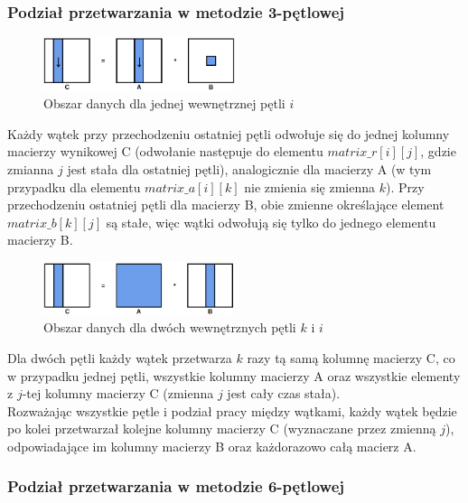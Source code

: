 \documentclass[10pt,a4paper]{article}
\begin{document}
\newpage

\subsubsection{Podział przetwarzania w metodzie 3-pętlowej}
\begin{figure}[h]
	\centering
	\includegraphics[width=0.5\textwidth]{3loops1.png}
	\caption{Obszar danych dla jednej wewnętrznej pętli $i$}
\end{figure}

Każdy wątek przy przechodzeniu ostatniej pętli odwołuje się do jednej kolumny macierzy wynikowej C (odwołanie następuje do elementu
$matrix\_r[i][j]$, gdzie zmianna $j$ jest stała dla ostatniej pętli), analogicznie dla macierzy A (w tym przypadku dla elementu $matrix\_a[i][k]$
nie zmienia się zmienna $k$). Przy przechodzeniu ostatniej pętli dla macierzy B, obie zmienne określające element $matrix\_b[k][j]$ są stałe, więc 
wątki odwołują się tylko do jednego elementu macierzy B.

\begin{figure}[h]
	\centering
	\includegraphics[width=0.5\textwidth]{3loops2.png}
	\caption{Obszar danych dla dwóch wewnętrznych pętli $k$ i $i$}
\end{figure}

Dla dwóch pętli każdy wątek przetwarza $k$ razy tą samą kolumnę macierzy C, co w przypadku jednej pętli, wszystkie kolumny 
macierzy A oraz wszystkie elementy z $j$-tej kolumny macierzy C (zmienna $j$ jest cały czas stała).\\

Rozważając wszystkie pętle i podział pracy między wątkami, każdy wątek będzie po kolei przetwarzał kolejne kolumny macierzy C (wyznaczane przez 
zmienną $j$), odpowiadające im kolumny macierzy B oraz każdorazowo całą macierz A.

\newpage

\subsubsection{Podział przetwarzania w metodzie 6-pętlowej}
\end{document}
